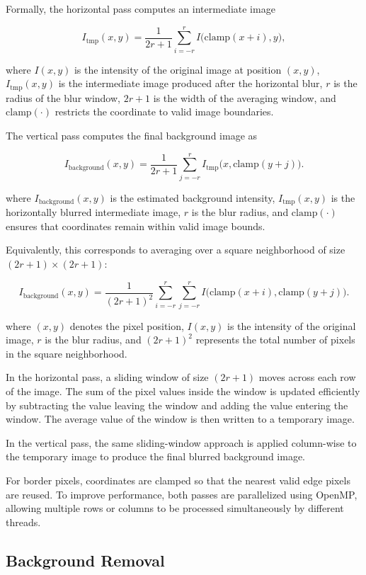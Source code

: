 Formally, the horizontal pass computes an intermediate image

\[
I_{\text{tmp}}(x,y) =
\frac{1}{2r+1}
\sum_{i=-r}^{r} I\bigl(\mathrm{clamp}(x+i), y\bigr),
\]

where $I(x,y)$ is the intensity of the original image at position $(x,y)$, $I_{\text{tmp}}(x,y)$ is the intermediate image produced after the horizontal blur, $r$ is the radius of the blur window, $2r+1$ is the width of the averaging window, and $\mathrm{clamp}(\cdot)$ restricts the coordinate to valid image boundaries.

The vertical pass computes the final background image as

\[
I_{\text{background}}(x,y) =
\frac{1}{2r+1}
\sum_{j=-r}^{r} I_{\text{tmp}}\bigl(x, \mathrm{clamp}(y+j)\bigr).
\]

where $I_{\text{background}}(x,y)$ is the estimated background intensity, $I_{\text{tmp}}(x,y)$ is the horizontally blurred intermediate image, $r$ is the blur radius, and $\mathrm{clamp}(\cdot)$ ensures that coordinates remain within valid image bounds.

Equivalently, this corresponds to averaging over a square neighborhood of size 
$(2r+1)\times(2r+1)$:

\[
I_{\text{background}}(x,y) =
\frac{1}{(2r+1)^2}
\sum_{i=-r}^{r} \sum_{j=-r}^{r}
I\bigl(\mathrm{clamp}(x+i), \mathrm{clamp}(y+j)\bigr).
\]

where $(x,y)$ denotes the pixel position, $I(x,y)$ is the intensity of the original image, $r$ is the blur radius, and $(2r+1)^2$ represents the total number of pixels in the square neighborhood.

In the horizontal pass, a sliding window of size $(2r+1)$ moves across each row of 
the image. The sum of the pixel values inside the window is updated efficiently by 
subtracting the value leaving the window and adding the value entering the window. 
The average value of the window is then written to a temporary image.

In the vertical pass, the same sliding-window approach is applied column-wise to the 
temporary image to produce the final blurred background image.

For border pixels, coordinates are clamped so that the nearest valid edge pixels 
are reused. To improve performance, both passes are parallelized using OpenMP, 
allowing multiple rows or columns to be processed simultaneously by different threads.

\subsection{Background Removal}

